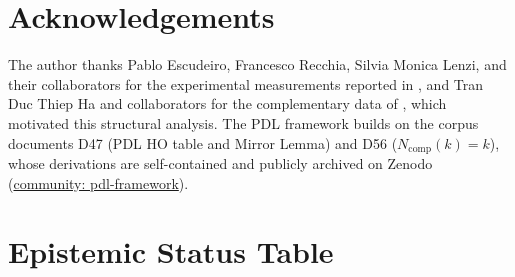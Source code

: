 \documentclass[12pt,a4paper]{article}
\theoremstyle{remark}
\begin{document}
\section*{Acknowledgements}

The author thanks Pablo Escudeiro, Francesco Recchia, Silvia Monica Lenzi, and their collaborators for the experimental measurements reported in \cite{Escudeiro_2026}, and Tran Duc Thiep Ha and collaborators for the complementary data of \cite{Ha_2021}, which motivated this structural analysis. The PDL framework builds on the corpus documents D47 (PDL HO table and Mirror Lemma) and D56 ($N_{\text{comp}}(k) = k$), whose derivations are self-contained and publicly archived on Zenodo (\href{https://zenodo.org/communities/pdl-framework}{community: pdl-framework}).

\clearpage

\appendix
\section{Epistemic Status Table}
\label{app:epistemic}
\end{document}
